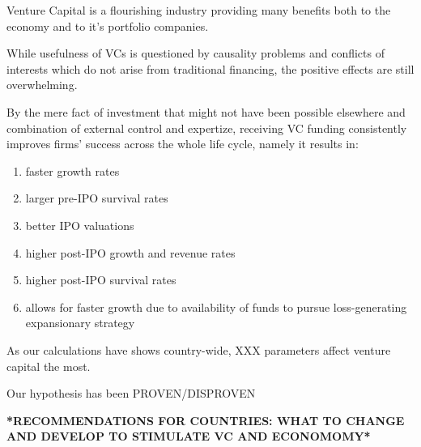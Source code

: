 
Venture Capital is a flourishing industry providing many benefits both to the economy and to it's portfolio companies.

While usefulness of VCs is questioned by causality problems and conflicts of interests which do not arise from traditional financing, the positive effects are still overwhelming.

By the mere fact of investment that might not have been possible elsewhere and combination of external control and expertize, receiving VC funding consistently improves firms' success across the whole life cycle, namely it results in:
\begin{enumerate}
    \item faster growth rates
    \item larger pre-IPO survival rates
    \item better IPO valuations
    \item higher post-IPO growth and revenue rates
    \item higher post-IPO survival rates
    \item allows for faster growth due to availability of funds to pursue loss-generating expansionary strategy
\end{enumerate}

As our calculations have shows country-wide, XXX parameters affect venture capital the most.

Our hypothesis has been PROVEN/DISPROVEN

\textbf{*RECOMMENDATIONS FOR COUNTRIES: WHAT TO CHANGE AND DEVELOP TO STIMULATE VC AND ECONOMOMY*}

